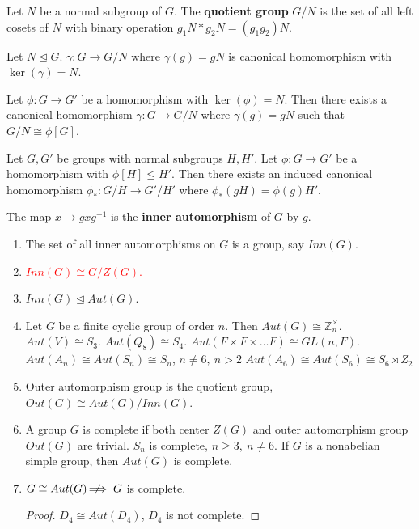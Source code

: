 \begin{definition}
	Let $N$ be a normal subgroup of $G$.
	The \textbf{quotient group} $G/N$ is the set of all left cosets of $N$ with binary operation $g_1N \ast g_2N = (g_1g_2)N$.
\end{definition}

\begin{theorem}
	Let $N \trianglelefteq G$. $\gamma : G \to G/N$ where $\gamma(g) = gN$ is canonical homomorphism with $\ker(\gamma)=N$.
\end{theorem}

\begin{theorem}
	Let $\phi : G \to G'$ be a homomorphism with $\ker(\phi)=N$. Then there exists a canonical homomorphism $\gamma : G \to G/N$ where $\gamma(g) = gN$ such that $G/N \cong \phi[G]$.
\end{theorem}

\begin{theorem}
	Let $G,G'$ be groups with normal subgroups $H,H'$. Let $\phi : G \to G'$ be a homomorphism with $\phi[H] \le H'$.
	Then there exists an induced canonical homomorphism $\phi_\ast : G/H \to G'/H'$ where $\phi_\ast(gH) = \phi(g)H'$.
\end{theorem}

\begin{definition}
	The map $x \to gxg^{-1}$ is the \textbf{inner automorphism} of $G$ by $g$.
\end{definition}
\begin{enumerate}
	\item The set of all inner automorphisms on $G$ is a group, say $Inn(G)$.
	\item \textcolor{red}{$Inn(G) \cong G/Z(G)$.}
	\item $Inn(G) \trianglelefteq Aut(G)$.
	\item Let $G$ be a finite cyclic group of order $n$. Then $Aut(G) \cong \mathbb{Z}_n^\times$.
		\subitem $Aut(V) \cong S_3$.
		\subitem $Aut(Q_8) \cong S_4$.
		\subitem $Aut(F \times F \times \dots F) \cong GL(n,F)$.
		\subitem $Aut(A_n) \cong Aut(S_n) \cong S_n$, $n \ne 6,\ n > 2$
		\subitem $Aut(A_6) \cong Aut(S_6) \cong S_6 \rtimes Z_2$
	\item Outer automorphism group is the quotient group, $Out(G) \cong Aut(G)/Inn(G)$.
	\item A group $G$ is complete if both center $Z(G)$ and outer automorphism group $Out(G)$ are trivial.
		\subitem $S_n$ is complete, $n \ge 3,\ n \ne 6$.
		\subitem If $G$ is a nonabelian simple group, then $Aut(G)$ is complete.
	\item $G \cong Aut(G) \;\not\nobreak\!\!\!\!\implies G$ is complete.
	\begin{proof}
		$D_4 \cong Aut(D_4)$, $D_4$ is not complete.
	\end{proof}
\end{enumerate}

